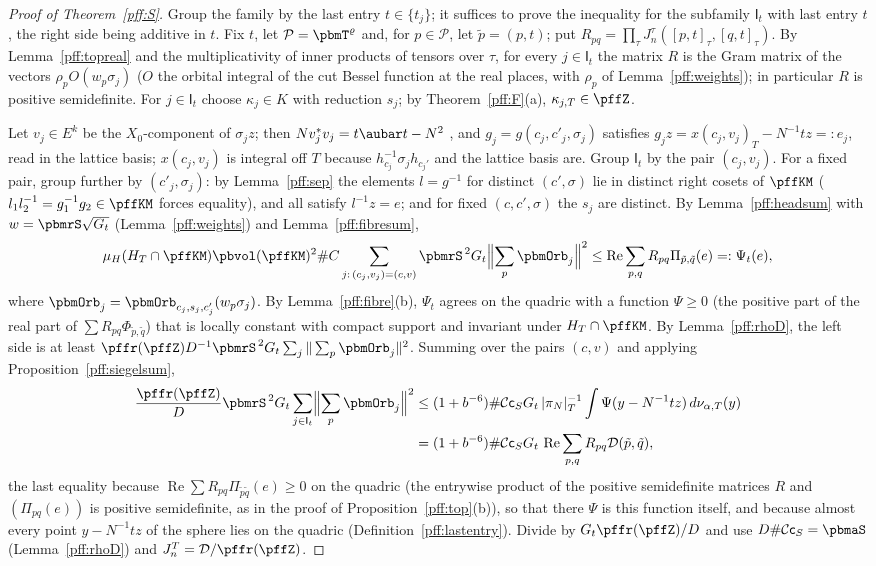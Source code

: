 \documentclass[10pt]{amsart}
\theoremstyle{definition}
\theoremstyle{remark}
\newcommand{\Rel}{\operatorname{Re}}
\begin{document}
\begin{proof}[Proof of Theorem~\ref{pff:S}]
Group the family by the last entry $t\in\{t_j\}$; it suffices to prove the inequality for the subfamily
$\mathsf I_t$ with last entry $t$, the right side being additive in $t$. Fix $t$, let $\mathcal P=\pbmT^\varrho$
and, for $p\in\mathcal P$, let $\tilde p=(p,t)$; put $R_{pq}=\prod_\tau J^\tau_n([p,t]_\tau,[q,t]_\tau)$. By
Lemma~\ref{pff:topreal} and the multiplicativity of inner products of tensors over $\tau$, for every $j\in
\mathsf I_t$ the matrix $R$ is the Gram matrix of the vectors $\rho_pO(w_p\sigma_j)$ ($O$ the orbital integral
of the cut Bessel function at the real places, with $\rho_p$ of Lemma~\ref{pff:weights}); in particular $R$ is
positive semidefinite. For $j\in\mathsf I_t$ choose $\kappa_j\in K$ with reduction $s_j$; by
Theorem~\ref{pff:F}(a), $\kappa_{j,T}\in\pffZ$.

Let $v_j\in E^k$ be the $X_0$-component of $\sigma_jz$; then $Nv_j^*v_j=t\aubar t-N^2$ {\cite[(32)]{P51}}, and
$g_j=g(c_j,c'_j,\sigma_j)$ satisfies $g_jz=x(c_j,v_j)_T-N^{-1}tz=:e_j$, read in the lattice basis; $x(c_j,
v_j)$ is integral off $T$ because $h_{c_j}^{-1}\sigma_jh_{c_j'}$ and the lattice basis are. Group $\mathsf I_t$ by
the pair $(c_j,v_j)$. For a fixed pair, group further by $(c'_j,\sigma_j)$: by Lemma~\ref{pff:sep} the elements
$l=g^{-1}$ for distinct $(c',\sigma)$ lie in distinct right cosets of $\pffKM$ ($l_1l_2^{-1}=g_1^{-1}g_2\in\pffKM$
forces equality), and all satisfy $l^{-1}z=e$; and for fixed $(c,c',\sigma)$ the $s_j$ are distinct.
By Lemma~\ref{pff:headsum} with $w=\pbmrS\sqrt{G_t}$ (Lemma~\ref{pff:weights}) and Lemma~\ref{pff:fibresum},
\[
\mu_H(H_T\cap\pffKM)\pbvol(\pffKM)^2\#C\sum_{j:\,(c_j,v_j)=(c,v)}\pbmrS^{\,2}G_t\Bigl\|\sum_p\pbmOrb_j\Bigr\|^2\le\Rel\sum_{p,q}
R_{pq}\Pi_{\tilde p,\tilde q}(e)=:\Psi_t(e),
\]
where $\pbmOrb_j=\pbmOrb_{c_j,s_j,c_j'}(w_p\sigma_j)$. By Lemma~\ref{pff:fibre}(b), $\Psi_t$ agrees on the quadric with a
function $\Psi\ge0$ (the positive part of the real part of $\sum R_{pq}\Phi_{\tilde p,\tilde q}$) that is locally
constant with compact support and invariant under $H_T\cap\pffKM$. By Lemma~\ref{pff:rhoD}, the left side is at
least $\pffr(\pffZ)D^{-1}\pbmrS^{\,2}G_t\sum_{j}\|\sum_p\pbmOrb_j\|^2$. Summing over the pairs $(c,v)$ and applying
Proposition~\ref{pff:siegelsum},
\[
\begin{aligned}\frac{\pffr(\pffZ)}D\pbmrS^{\,2}G_t\sum_{j\in\mathsf I_t}\Bigl\|\sum_p\pbmOrb_j\Bigr\|^2&\le(1+b^{-6})\#\mathcal C\mathsf c_SG_t\,
|\pi_N|_T^{-1}\int\Psi(y-N^{-1}tz)\,d\nu_{\alpha,T}(y)\\&=(1+b^{-6})\#\mathcal C\mathsf c_SG_t\,\Rel\sum_{p,q}R_{pq}\mathcal
D(\tilde p,\tilde q),\end{aligned}
\]
the last equality because $\Rel\sum R_{pq}\Pi_{\tilde p\tilde q}(e)\ge0$ on the quadric (the entrywise product of the positive semidefinite matrices $R$ and $(\Pi_{pq}(e))$ is positive semidefinite, as in the proof of Proposition~\ref{pff:top}(b)), so that there $\Psi$ is this function itself, and because almost every point $y-N^{-1}tz$ of the sphere lies on the quadric
(Definition~\ref{pff:lastentry}). Divide by $G_t\pffr(\pffZ)/D$ and use $D\#\mathcal C\mathsf c_S=\pbmaS$
(Lemma~\ref{pff:rhoD}) and $J^T_n=\mathcal D/\pffr(\pffZ)$.
\end{proof}
\end{document}
